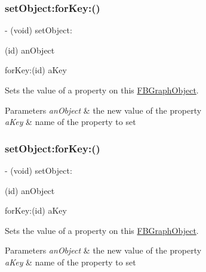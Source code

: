 \subsubsection{\texorpdfstring{set\+Object\+:for\+Key\+:()}{setObject:forKey:()}\hspace{0.1cm}{\footnotesize\ttfamily [1/5]}}
{\footnotesize\ttfamily -\/ (void) set\+Object\+: \begin{DoxyParamCaption}\item[{(id)}]{an\+Object }\item[{forKey:(id)}]{a\+Key }\end{DoxyParamCaption}}

Sets the value of a property on this {\ttfamily \hyperlink{interfaceFBGraphObject}{F\+B\+Graph\+Object}}.


\begin{DoxyParams}{Parameters}
{\em an\+Object} & the new value of the property \\
\hline
{\em a\+Key} & name of the property to set \\
\hline
\end{DoxyParams}
\mbox{\label{protocolFBGraphObject-p_a9b7573bc6e372ff8f4f33c3d144ea620}} 
\subsubsection{\texorpdfstring{set\+Object\+:for\+Key\+:()}{setObject:forKey:()}\hspace{0.1cm}{\footnotesize\ttfamily [2/5]}}
{\footnotesize\ttfamily -\/ (void) set\+Object\+: \begin{DoxyParamCaption}\item[{(id)}]{an\+Object }\item[{forKey:(id)}]{a\+Key }\end{DoxyParamCaption}}

Sets the value of a property on this {\ttfamily \hyperlink{interfaceFBGraphObject}{F\+B\+Graph\+Object}}.


\begin{DoxyParams}{Parameters}
{\em an\+Object} & the new value of the property \\
\hline
{\em a\+Key} & name of the property to set \\
\hline
\end{DoxyParams}
\mbox{\label{protocolFBGraphObject-p_a9b7573bc6e372ff8f4f33c3d144ea620}} 
